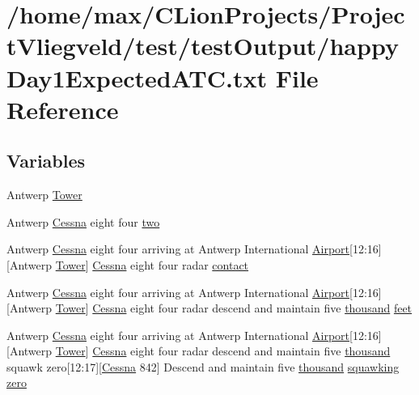 \hypertarget{happyDay1ExpectedATC_8txt}{}\section{/home/max/\+C\+Lion\+Projects/\+Project\+Vliegveld/test/test\+Output/happy\+Day1\+Expected\+A\+TC.txt File Reference}
\label{happyDay1ExpectedATC_8txt}
\subsection*{Variables}
\begin{DoxyCompactItemize}
\item 
Antwerp \hyperlink{happyDay1ExpectedATC_8txt_a1eb79599ee2cca5bc8c8adc87a257c7c}{Tower}
\item 
Antwerp \hyperlink{test_2testOutput_2log_8txt_a3de326468ae3f37941c91ae68853a1af}{Cessna} eight four \hyperlink{happyDay1ExpectedATC_8txt_aa0469efe401676f277c03bf9d9d4a983}{two}
\item 
Antwerp \hyperlink{test_2testOutput_2log_8txt_a3de326468ae3f37941c91ae68853a1af}{Cessna} eight four arriving at Antwerp International \hyperlink{classAirport}{Airport}\mbox{[}12\+:16\mbox{]}\mbox{[}Antwerp \hyperlink{test_2testOutput_2log_8txt_ade5c2a9317c664c53d015e41bdc32393}{Tower}\mbox{]} \hyperlink{test_2testOutput_2log_8txt_a3de326468ae3f37941c91ae68853a1af}{Cessna} eight four radar \hyperlink{happyDay1ExpectedATC_8txt_aabccce409c3b74e74ea0c068d4a73f10}{contact}
\item 
Antwerp \hyperlink{test_2testOutput_2log_8txt_a3de326468ae3f37941c91ae68853a1af}{Cessna} eight four arriving at Antwerp International \hyperlink{classAirport}{Airport}\mbox{[}12\+:16\mbox{]}\mbox{[}Antwerp \hyperlink{test_2testOutput_2log_8txt_ade5c2a9317c664c53d015e41bdc32393}{Tower}\mbox{]} \hyperlink{test_2testOutput_2log_8txt_a3de326468ae3f37941c91ae68853a1af}{Cessna} eight four radar descend and maintain five \hyperlink{happyDay5ExpectedATC_8txt_a429913a0643fe14faca3dca538caa7bb}{thousand} \hyperlink{happyDay1ExpectedATC_8txt_adb5a296986a5b6019ec88f520f243c26}{feet}
\item 
Antwerp \hyperlink{test_2testOutput_2log_8txt_a3de326468ae3f37941c91ae68853a1af}{Cessna} eight four arriving at Antwerp International \hyperlink{classAirport}{Airport}\mbox{[}12\+:16\mbox{]}\mbox{[}Antwerp \hyperlink{test_2testOutput_2log_8txt_ade5c2a9317c664c53d015e41bdc32393}{Tower}\mbox{]} \hyperlink{test_2testOutput_2log_8txt_a3de326468ae3f37941c91ae68853a1af}{Cessna} eight four radar descend and maintain five \hyperlink{happyDay5ExpectedATC_8txt_a429913a0643fe14faca3dca538caa7bb}{thousand} squawk zero\mbox{[}12\+:17\mbox{]}\mbox{[}\hyperlink{test_2testOutput_2log_8txt_a3de326468ae3f37941c91ae68853a1af}{Cessna} 842\mbox{]} Descend and maintain five \hyperlink{happyDay5ExpectedATC_8txt_a429913a0643fe14faca3dca538caa7bb}{thousand} \hyperlink{test_2testOutput_2log_8txt_a890147ec88e2d9518adf949981616843}{squawking} \hyperlink{happyDay1ExpectedATC_8txt_adce466d7618784129bcb0feb6d2d98e4}{zero}

\end{DoxyCompactItemize}
